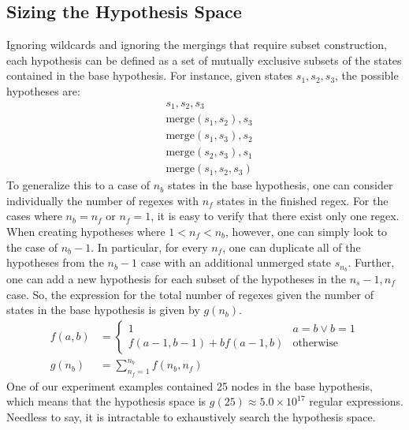 \documentclass[10pt,letterpaper]{article}
\begin{document}
\subsection{Sizing the Hypothesis Space}
Ignoring wildcards and ignoring the mergings that require subset construction, each hypothesis can be defined as a set of mutually exclusive subsets of the states contained in the base hypothesis. For instance, given states $s_1, s_2, s_3$, the possible hypotheses are:
	\begin{align*}
		&s_1, s_2, s_3
		\\&\text{merge}(s_1, s_2), s_3
		\\&\text{merge}(s_1, s_3), s_2
		\\&\text{merge}(s_2, s_3), s_1
		\\&\text{merge}(s_1, s_2, s_3)
	\end{align*}
To generalize this to a case of $n_b$ states in the base hypothesis, one can consider individually the number of regexes with $n_f$ states in the finished regex. For the cases where $n_b=n_f$ or $n_f=1$, it is easy to verify that there exist only one regex. When creating hypotheses where $1 < n_f < n_b$, however, one can simply look to the case of $n_b - 1$. In particular, for every $n_f$, one can duplicate all of the hypotheses from the $n_b - 1$ case with an additional unmerged state $s_{n_b}$. Further, one can add a new hypothesis for each subset of the hypotheses in the $n_s-1, n_f$ case. So, the expression for the total number of regexes given the number of states in the base hypothesis is given by $g(n_b)$.
	\begin{align*}
	f(a, b) &= \left\{
			\begin{array}{cl}
         		1 & a=b \vee b=1 \\
         		f(a-1, b-1) + b f(a-1, b) & \mbox{otherwise}
            \end{array}\right.
		\\ g(n_b) &=\sum_{n_f=1}^{n_b} f(n_b, n_f)
	\end{align*}
One of our experiment examples contained 25 nodes in the base hypothesis, which means that the hypothesis space is $g(25)\approx 5.0 \times 10^{17}$ regular expressions. Needless to say, it is intractable to exhaustively search the hypothesis space.
\end{document}
